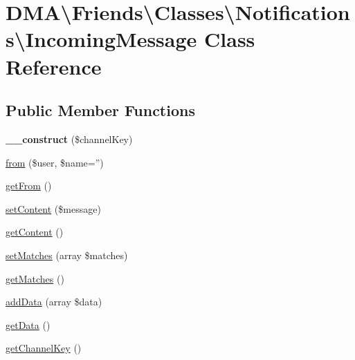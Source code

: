 \hypertarget{classDMA_1_1Friends_1_1Classes_1_1Notifications_1_1IncomingMessage}{\section{D\-M\-A\textbackslash{}Friends\textbackslash{}Classes\textbackslash{}Notifications\textbackslash{}Incoming\-Message Class Reference}
\label{classDMA_1_1Friends_1_1Classes_1_1Notifications_1_1IncomingMessage}
}
\subsection*{Public Member Functions}
\begin{DoxyCompactItemize}
\item 
\hypertarget{classDMA_1_1Friends_1_1Classes_1_1Notifications_1_1IncomingMessage_a859682e7cd422373fd51aeb05e4a8ecd}{{\bfseries \-\_\-\-\_\-construct} (\$channel\-Key)}\label{classDMA_1_1Friends_1_1Classes_1_1Notifications_1_1IncomingMessage_a859682e7cd422373fd51aeb05e4a8ecd}

\item 
\hyperlink{classDMA_1_1Friends_1_1Classes_1_1Notifications_1_1IncomingMessage_a2a37952bdb070d65012f6895d0abd542}{from} (\$user, \$name='')
\item 
\hyperlink{classDMA_1_1Friends_1_1Classes_1_1Notifications_1_1IncomingMessage_a5d7b4a3a75d403ba5e3f250dbe6bb1fc}{get\-From} ()
\item 
\hyperlink{classDMA_1_1Friends_1_1Classes_1_1Notifications_1_1IncomingMessage_a120b5ebba73260b40a0b6a820e26862d}{set\-Content} (\$message)
\item 
\hyperlink{classDMA_1_1Friends_1_1Classes_1_1Notifications_1_1IncomingMessage_a6c870deb4ee36765884d7c7e70d79203}{get\-Content} ()
\item 
\hyperlink{classDMA_1_1Friends_1_1Classes_1_1Notifications_1_1IncomingMessage_a1a9c1b9b62e4601d0f31ee1c2e4c9272}{set\-Matches} (array \$matches)
\item 
\hyperlink{classDMA_1_1Friends_1_1Classes_1_1Notifications_1_1IncomingMessage_a55e79b4061799e19ce96a13b5b59f4a6}{get\-Matches} ()
\item 
\hyperlink{classDMA_1_1Friends_1_1Classes_1_1Notifications_1_1IncomingMessage_a9fd9a20192b9afc5000660391ebf3a01}{add\-Data} (array \$data)
\item 
\hyperlink{classDMA_1_1Friends_1_1Classes_1_1Notifications_1_1IncomingMessage_a13920ffca0f167439137e3766187dc3e}{get\-Data} ()
\item 
\hyperlink{classDMA_1_1Friends_1_1Classes_1_1Notifications_1_1IncomingMessage_a9a6d0d32bb31053a0880db8886001c41}{get\-Channel\-Key} ()
\end{DoxyCompactItemize}
